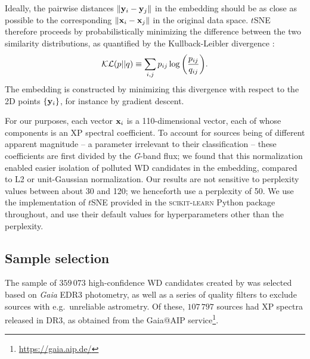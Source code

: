\documentclass[fleqn,usenatbib]{rasti}
\newcommand\xb{\vb{x}}
\newcommand\yb{\vb{y}}
\begin{document}
Ideally, the pairwise distances $\norm{\yb_i-\yb_j}$ in the embedding should be as close as possible to the corresponding $\norm{\xb_i-\xb_j}$ in the original data space.
$t$SNE therefore proceeds by probabilistically minimizing the difference between the two similarity distributions, as quantified by the Kullback-Leibler divergence \citep{kullbackleibler}:
\begin{equation}
\mathcal{KL}(p||q)
\equiv \sum_{i, j} p_{ij} \log \qty(
    \frac{p_{ij}}{q_{ij}}
).
\end{equation}
The embedding is constructed by minimizing this divergence with respect to the 2D points $\{\yb_i\}$, for instance by gradient descent.

For our purposes, each vector $\xb_i$ is a 110-dimensional vector, each of whose components is an XP spectral coefficient.
To account for sources being of different apparent magnitude -- a parameter irrelevant to their classification -- these coefficients are first divided by the \textit{G}-band flux; we found that this normalization enabled easier isolation of polluted WD candidates in the embedding, compared to L2 or unit-Gaussian normalization.
Our results are not sensitive to perplexity values between about 30 and 120; we henceforth use a perplexity of 50.
We use the implementation of $t$SNE provided in the \textsc{scikit-learn} Python package \citep{sklearn} throughout, and use their default values for hyperparameters other than the perplexity.


\subsection{Sample selection}
The sample of $359\,073$ high-confidence WD candidates created by \citet{gentilefusillo21} was selected based on \textit{Gaia} EDR3 photometry, as well as a series of quality filters to exclude sources with e.g.\ unreliable astrometry.
Of these, $107\,797$ sources had XP spectra released in DR3, as obtained from the Gaia@AIP service\footnote{
    \url{https://gaia.aip.de/}
}.
\end{document}
